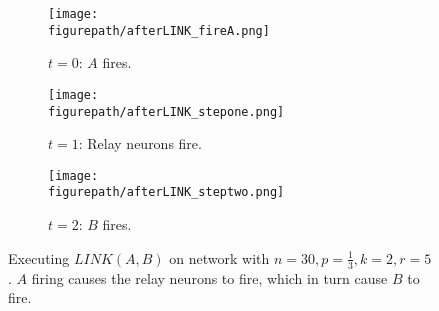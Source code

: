 \documentclass[letterpaper, 12pt]{article}
\newcommand{\figurepath}{../../Figures}
\begin{document}
\begin{figure}[!htb]
\centering
\begin{subfigure}[b]{0.3\textwidth}
      \texttt{[image: \\figurepath/afterLINK\_fireA.png]}
      \caption*{$t=0$: $A$ fires.}
\end{subfigure}
\begin{subfigure}[b]{0.3\textwidth}
      \texttt{[image: \\figurepath/afterLINK\_stepone.png]}
      \caption*{$t=1$: Relay neurons fire.}
\end{subfigure}
\begin{subfigure}[b]{0.3\textwidth}
      \texttt{[image: \\figurepath/afterLINK\_steptwo.png]}
      \caption*{$t=2$: $B$ fires.}
\end{subfigure}
\caption{Executing $LINK(A,B)$ on network with $n=30,p=\frac{1}{3},k=2,r=5$. $A$ firing causes the relay neurons to fire, which in turn cause $B$ to fire.}\label{fig:executingLINK}
\end{figure}
\end{document}
